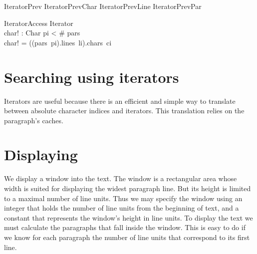 \documentclass{article}
\begin{document}
\begin{zed}
IteratorPrev  IteratorPrevChar \lor IteratorPrevLine \lor IteratorPrevPar
\end{zed}

\begin{schema}{IteratorAccess}
	\Xi Iterator \\
	char! : Char
\where
	pi < \# pars \\
	char! = ((pars~pi).lines~li).chars~ci
\end{schema}

\section{Searching using iterators}

Iterators are useful because there is an efficient and simple way to translate between absolute character indices and iterators. This translation relies on the paragraph's caches. 


\section{Displaying}

We display a window into the text. The window is a rectangular area whose width is suited for displaying the widest paragraph line. But its height is limited to a maximal number of line units. Thus we may specify the window using an integer that holds the number of line units from the beginning of text, and a constant that represents the window's height in line units. To display the text we must calculate the paragraphs that fall inside the window. This is easy to do if we know for each paragraph the number of line units that correspond to its first line. 
\end{document}
